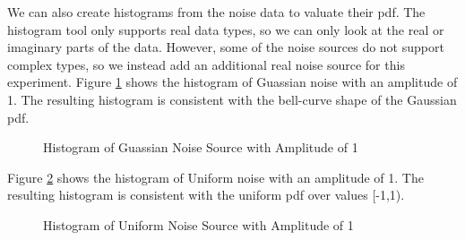 \documentclass{article}
\begin{document}
We can also create histograms from the noise data to valuate their pdf. The histogram tool only supports real data types, so we can only look at the real or imaginary parts of the data. However, some of the noise sources do not support complex types, so we instead add an additional real noise source for this experiment. Figure \ref{fig::gaussian_noise_histogram} shows the histogram of Guassian noise with an amplitude of 1. The resulting histogram is consistent with the bell-curve shape of the Gaussian pdf.

\begin{figure}[H]
	\centerline{}
	\caption{Histogram of Guassian Noise Source with Amplitude of 1}
	\label{fig::gaussian_noise_histogram}
\end{figure}

Figure \ref{fig::uniform_noise_histogram} shows the histogram of Uniform noise with an amplitude of 1. The resulting histogram is consistent with the uniform pdf over values [-1,1).

\begin{figure}[H]
	\centerline{}
	\caption{Histogram of Uniform Noise Source with Amplitude of 1}
	\label{fig::uniform_noise_histogram}
\end{figure}
\end{document}
